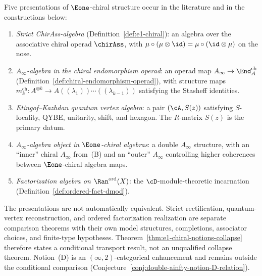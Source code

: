 \begin{warning}
\label{warn:multiple-e1-chiral}
Five presentations of $\Eone$-chiral structure occur in the
literature and in the constructions below:
\begin{enumerate}[label=\textup{(\Alph*)}]
\item \emph{Strict ChirAss-algebra}
 (Definition~\ref{def:e1-chiral}): an algebra over
 the associative chiral operad $\chirAss$, with
 $\mu \circ (\mu \otimes \id) = \mu \circ (\id \otimes \mu)$
 on the nose.
\item \emph{$A_\infty$-algebra in the chiral endomorphism
 operad}: an operad map
 $A_\infty \to \End^{\mathrm{ch}}_A$
 (Definition~\ref{def:chiral-endomorphism-operad}),
 with structure maps
 $m_k^{\mathrm{ch}} \colon A^{\otimes k} \to
 A((\lambda_1))\cdots((\lambda_{k-1}))$ satisfying
 the Stasheff identities.
\item \emph{Etingof--Kazhdan quantum vertex algebra}: a pair
 $(\cA, S(z))$ satisfying $S$-locality, QYBE, unitarity,
 shift, and hexagon. The $R$-matrix $S(z)$ is the primary
 datum.
\item \emph{$A_\infty$-algebra object in $\Eone$-chiral
 algebras}: a double $A_\infty$ structure, with an
 ``inner'' chiral $A_\infty$ from~(B) and an ``outer''
 $A_\infty$ controlling higher coherences between
 $\Eone$-chiral algebra maps.
\item \emph{Factorization algebra on
 $\Ran^{\mathrm{ord}}(X)$}: the $\cD$-module-theoretic
 incarnation
 (Definition~\ref{def:ordered-fact-dmod}).
\end{enumerate}
The presentations are not automatically equivalent. Strict
rectification, quantum-vertex reconstruction, and ordered
factorization realization are separate comparison theorems with
their own model structures, completions, associator choices, and
finite-type hypotheses. Theorem~\ref{thm:e1-chiral-notions-collapse}
therefore states a conditional transport result, not an
unqualified collapse theorem. Notion~\textup{(D)} is an
$(\infty,2)$-categorical enhancement and remains outside the
conditional comparison
(Conjecture~\ref{conj:double-ainfty-notion-D-relation}).
\end{warning}

